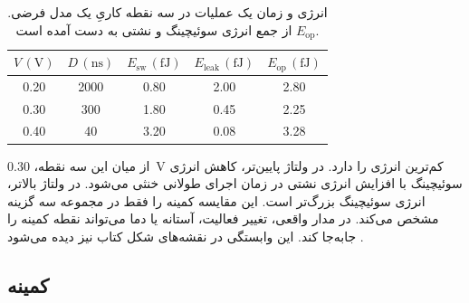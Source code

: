 \begin{table}[htbp]
  \centering
  \caption{انرژی و زمان یک عملیات در سه نقطه کاریِ یک مدل فرضی.
    \(E_{\mathrm{op}}\) از جمع انرژی سوئیچینگ و نشتی به دست آمده است.}
  \label{tab:power-energy-candidates}
  \begin{tabular}{ccccc}
    \toprule
    \(V\,(\unit{\volt})\) & \(D\,(\unit{\nano\second})\) &
    \(E_{\mathrm{sw}}\,(\unit{\femto\joule})\) &
    \(E_{\mathrm{leak}}\,(\unit{\femto\joule})\) &
    \(E_{\mathrm{op}}\,(\unit{\femto\joule})\) \\
    \midrule
    \num{0.20} & \num{2000} & \num{0.80} & \num{2.00} & \num{2.80} \\
    \num{0.30} & \num{300}  & \num{1.80} & \num{0.45} & \num{2.25} \\
    \num{0.40} & \num{40}   & \num{3.20} & \num{0.08} & \num{3.28} \\
    \bottomrule
  \end{tabular}
\end{table}

از میان این سه نقطه، \qty{0.30}{\volt} کم‌ترین انرژی را دارد.
در ولتاژ پایین‌تر، کاهش انرژی سوئیچینگ با افزایش انرژی نشتی در
زمان اجرای طولانی خنثی می‌شود. در ولتاژ بالاتر، انرژی سوئیچینگ
بزرگ‌تر است. این مقایسه کمینه را فقط در مجموعه سه گزینه مشخص
می‌کند. در مدار واقعی، تغییر فعالیت، آستانه یا دما می‌تواند
نقطه کمینه را جابه‌جا کند. این وابستگی در نقشه‌های شکل
 کتاب نیز دیده می‌شود \cite[صفحات ۲۰۲ و ۲۰۳]{weste}.

\subsection{کمینه }
\label{sec:power-edp}

